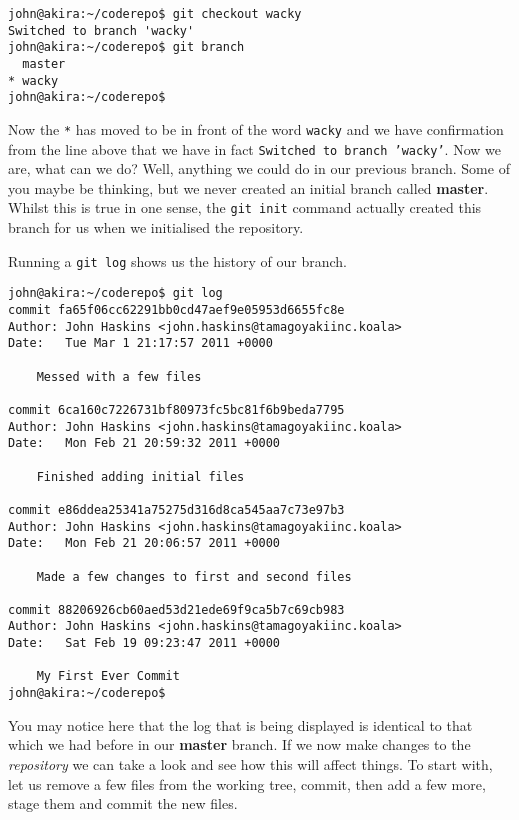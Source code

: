 \begin{Verbatim}[frame=leftline,framerule=1mm,fontsize=\relsize{-3}] 
john@akira:~/coderepo$ git checkout wacky
Switched to branch 'wacky'
john@akira:~/coderepo$ git branch
  master
* wacky
john@akira:~/coderepo$ 
\end{Verbatim}

Now the \texttt{*} has moved to be in front of the word \texttt{wacky} and we have confirmation from the line above that we have in fact \texttt{Switched to branch 'wacky'}.  Now we are, what can we do?  Well, anything we could do in our previous branch.  Some of you maybe be thinking, but we never created an initial branch called \textbf{master}.  Whilst this is true in one sense, the \texttt{git init} command actually created this branch for us when we initialised the repository.

Running a \texttt{git log} shows us the history of our branch.  

\begin{Verbatim}[frame=leftline,framerule=1mm,fontsize=\relsize{-3}] 
john@akira:~/coderepo$ git log
commit fa65f06cc62291bb0cd47aef9e05953d6655fc8e
Author: John Haskins <john.haskins@tamagoyakiinc.koala>
Date:   Tue Mar 1 21:17:57 2011 +0000

    Messed with a few files

commit 6ca160c7226731bf80973fc5bc81f6b9beda7795
Author: John Haskins <john.haskins@tamagoyakiinc.koala>
Date:   Mon Feb 21 20:59:32 2011 +0000

    Finished adding initial files

commit e86ddea25341a75275d316d8ca545aa7c73e97b3
Author: John Haskins <john.haskins@tamagoyakiinc.koala>
Date:   Mon Feb 21 20:06:57 2011 +0000

    Made a few changes to first and second files

commit 88206926cb60aed53d21ede69f9ca5b7c69cb983
Author: John Haskins <john.haskins@tamagoyakiinc.koala>
Date:   Sat Feb 19 09:23:47 2011 +0000

    My First Ever Commit
john@akira:~/coderepo$ 
\end{Verbatim}

You may notice here that the log that is being displayed is identical to that which we had before in our \textbf{master} branch.  If we now make changes to the \emph{repository} we can take a look and see how this will affect things.  To start with, let us remove a few files from the working tree, commit, then add a few more, stage them and commit the new files.

